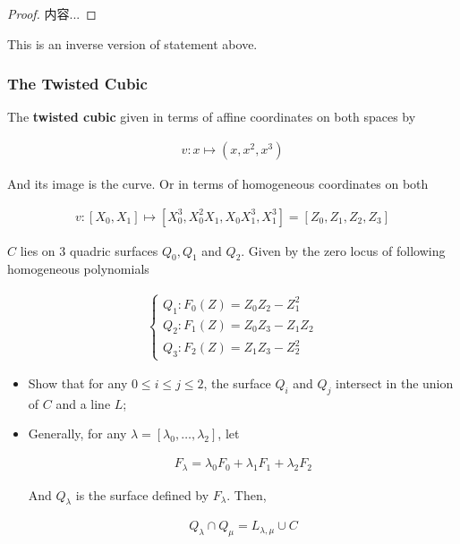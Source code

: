 \documentclass[Total.tex]{subfiles}
\begin{document}
			\begin{proof}
				内容...
			\end{proof}
			
			This is an inverse version of statement above.
			
			\subsubsection{The Twisted Cubic}
			
			\begin{Def}
				The \textbf{twisted cubic} given in terms of affine coordinates on both spaces by
				
				\begin{gather*}
					v:x\mapsto (x,x^2,x^3) 
				\end{gather*}
				
				And its image is the curve. Or in terms of homogeneous coordinates on both
				
				\begin{gather*}
					v:[X_0,X_1]\mapsto [X_0^3,X_0^2X_1,X_0X_1^3,X_1^3]=[Z_0,Z_1,Z_2,Z_3]
				\end{gather*}
			\end{Def}
			
			$C$ lies on $3$ quadric surfaces $Q_0,Q_1$ and $Q_2$. Given by the zero locus of following homogeneous polynomials
			
			\begin{gather*}
				\begin{cases}
					Q_1:F_0(Z)=Z_0Z_2-Z_1^2\\
					Q_2:F_1(Z)=Z_0Z_3-Z_1Z_2\\
					Q_3:F_2(Z)=Z_1Z_3-Z_2^2
				\end{cases}
			\end{gather*}
			
			\begin{lemma}
				\begin{itemize}
					\item Show that for any $0\leq i\leq j\leq 2$, the surface $Q_i$ and $Q_j$ intersect in the union of $C$ and a line $L$;
					\item Generally, for any $\lambda=[\lambda_0,\dots,\lambda_2]$, let 
					
					\begin{gather*}
						F_\lambda=\lambda_0 F_0+\lambda_1 F_1+\lambda_2 F_2
					\end{gather*}
					
					And $Q_\lambda$ is the surface defined by $F_\lambda$. Then, 
					
					\begin{gather*}
						Q_\lambda\cap Q_\mu=L_{\lambda,\mu}\cup C
					\end{gather*}
				\end{itemize}
			\end{lemma}
			
\end{document}
